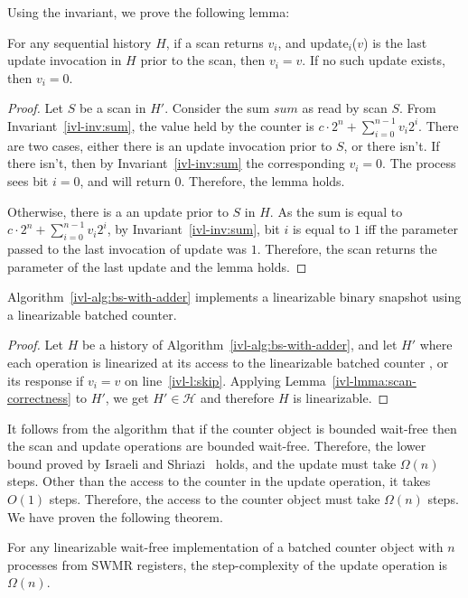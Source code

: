 Using the invariant, we prove the following lemma:
\begin{lemma}
    For any sequential history $H$, if a {\sc scan} returns $v_i$, and {\sc update}$_i$($v$) is the last update invocation in $H$
    prior to the {\sc scan}, then $v_i = v$. If no such update exists, then $v_i=0$.
    \label{ivl-lmma:scan-correctness}
\end{lemma}
\begin{proof}
    Let $S$ be a {\sc scan} in $H'$. Consider the sum $\textit{sum}$ as read by scan $S$.
    From Invariant~\ref{ivl-inv:sum}, the value held by the counter is $c \cdot 2^n + \sum_{i=0}^{n-1}v_i2^i$.
    There are two cases, either there is an update invocation prior to $S$, or there isn't. If there isn't, then by
    Invariant~\ref{ivl-inv:sum} the corresponding $v_i=0$. The process sees bit $i=0$,
    and will return $0$. Therefore, the lemma holds.

    Otherwise, there is a an update prior to $S$ in $H$. As the sum is equal to $c \cdot 2^n + \sum_{i=0}^{n-1}v_i2^i$,
    by Invariant~\ref{ivl-inv:sum}, bit $i$ is equal to $1$ iff the parameter passed to the last invocation of update was $1$.
    Therefore, the scan returns the parameter of the last update and the lemma holds.
\end{proof}

\begin{lemma}
    Algorithm~\ref{ivl-alg:bs-with-adder} implements a linearizable binary snapshot using a linearizable batched counter.
    \label{ivl-lmma:reduction}
\end{lemma}
\begin{proof}
    Let $H$ be a history of Algorithm~\ref{ivl-alg:bs-with-adder}, and let $H'$ 
    where each operation is linearized at its access to the linearizable batched counter , or
    its response if $v_i = v$ on line~\ref{ivl-l:skip}.
    Applying Lemma~\ref{ivl-lmma:scan-correctness} to $H'$, we get $H' \in \mathcal{H}$ and therefore $H$ is linearizable.
\end{proof}

It follows from the algorithm that if the counter
object is bounded wait-free then the {\sc scan} and {\sc update} operations are bounded wait-free. Therefore, the lower
bound proved by Israeli and Shriazi~\cite{israeli1998time} holds, and the {\sc update} must take $\Omega(n)$
steps. Other than the access to the counter in the {\sc update} operation, it takes
$O(1)$ steps. Therefore, the access to the counter object must take $\Omega(n)$ steps. We have proven the following theorem.
\begin{theorem}
    For any linearizable wait-free implementation of a batched counter object with $n$ processes from SWMR registers, the step-complexity
    of the {\sc update} operation is $\Omega(n)$.
    \label{ivl-thm:lower-bound}
\end{theorem}

